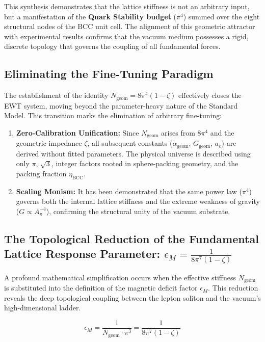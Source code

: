 \documentclass[10pt,a4paper]{article}
\begin{document}
This synthesis demonstrates that the lattice stiffness is not an arbitrary input, but a manifestation of the \textbf{Quark Stability budget} (\(\pi^4\)) summed over the eight structural nodes of the BCC unit cell. The alignment of this geometric attractor with experimental results confirms that the vacuum medium possesses a rigid, discrete topology that governs the coupling of all fundamental forces.

\subsection{Eliminating the Fine-Tuning Paradigm}
\label{sec:eliminating_fine_tunig_paradigm}

The establishment of the identity \(N_{\text{geom}} = 8\pi^4(1-\zeta)\) effectively closes the EWT system, moving beyond the parameter-heavy nature of the Standard Model. This transition marks the elimination of arbitrary fine-tuning:
\begin{enumerate}
	\item \textbf{Zero-Calibration Unification:} Since \(N_{\text{geom}}\) arises from \(8\pi^4\) and the geometric impedance \(\zeta\), all subsequent constants (\(\alpha_{\text{geom}}\), \(G_{\text{geom}}\), \(a_e\)) are derived without fitted parameters. The physical universe is described using only \(\pi\), \(\sqrt{3}\), integer factors rooted in sphere-packing geometry, and the packing fraction \(\eta_{\text{BCC}}\).
	\item \textbf{Scaling Monism:} It has been demonstrated that the same power law (\(\pi^4\)) governs both the internal lattice stiffness and the extreme weakness of gravity (\(G \propto A_{\pi}^{-4}\)), confirming the structural unity of the vacuum substrate.
\end{enumerate}

\subsection{The Topological Reduction of the Fundamental Lattice Response Parameter:
	\(\epsilon_M = \frac{1}{8\pi^7(1-\zeta)}\)}

A profound mathematical simplification occurs when the effective stiffness \(N_{\text{geom}}\) is substituted into the definition of the magnetic deficit factor \(\epsilon_M\). This reduction reveals the deep topological coupling between the lepton soliton and the vacuum's high-dimensional ladder.

\begin{equation}
	\label{eq:epsilon_M_reduction}
	\boxed{
		\epsilon_M
		=
		\frac{1}{N_{\text{geom}} \cdot \pi^3}
		=
		\frac{1}{8\pi^7(1-\zeta)}
	}
\end{equation}
\end{document}
